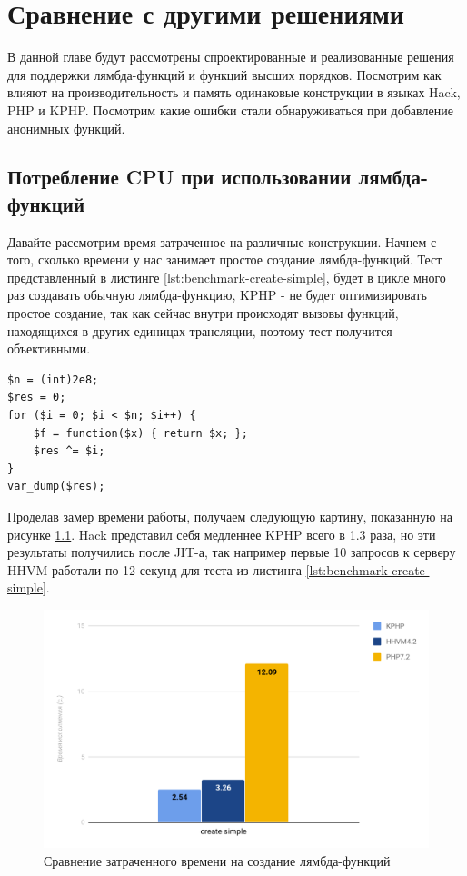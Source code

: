 
\chapter{Сравнение с другими решениями}
В данной главе будут рассмотрены спроектированные и реализованные решения для поддержки лямбда-функций и функций высших порядков.
Посмотрим как влияют на производительность и память одинаковые конструкции в языках Hack, PHP и KPHP.
Посмотрим какие ошибки стали обнаруживаться при добавление анонимных функций.

\section{Потребление CPU при использовании лямбда-функций}
Давайте рассмотрим время затраченное на различные конструкции.
Начнем с того, сколько времени у нас занимает простое создание лямбда-функций.
Тест представленный в листинге \ref{lst:benchmark-create-simple}, будет в цикле много раз создавать обычную лямбда-функцию, KPHP - не будет оптимизировать простое создание, так как сейчас внутри происходят вызовы функций, находящихся в других единицах трансляции, поэтому тест получится объективными.
\begin{lstlisting}[caption={Бенчмарк создания анонимных функций},label={lst:benchmark-create-simple}]
$n = (int)2e8;
$res = 0;
for ($i = 0; $i < $n; $i++) {
    $f = function($x) { return $x; };
    $res ^= $i;
}
var_dump($res);
\end{lstlisting}

Проделав замер времени работы, получаем следующую картину, показанную на рисунке \ref{fig:benchmark-create-simple}.
Hack представил себя медленнее KPHP всего в 1.3 раза, но эти результаты получились после JIT-а, так например первые 10 запросов к серверу HHVM работали по 12 секунд для теста из листинга \ref{lst:benchmark-create-simple}.
\begin{figure}[H]
    \caption{Сравнение затраченного времени на создание лямбда-функций}
    \label{fig:benchmark-create-simple}
    \centering
    \includegraphics[width=\linewidth]{images/benchmark_create_simple}
\end{figure}

